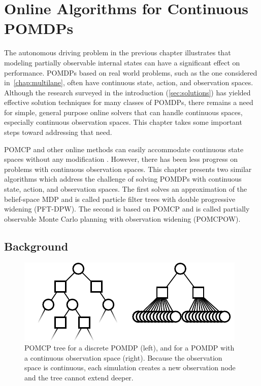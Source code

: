 \chapter{Online Algorithms for Continuous POMDPs} \label{chap:pomcpow}

The autonomous driving problem in the previous chapter illustrates that modeling partially observable internal states can have a significant effect on performance.
POMDPs based on real world problems, such as the one considered in~\cref{chap:multilane}, often have continuous state, action, and observation spaces.
Although the research surveyed in the introduction (\cref{sec:solutions}) has yielded effective solution techniques for many classes of POMDPs, there remains a need for simple, general purpose online solvers that can handle continuous spaces, especially continuous observation spaces.
This chapter takes some important steps toward addressing that need.

POMCP and other online methods can easily accommodate continuous state spaces without any modification \cite{goldhoorn2014continuous}.
However, there has been less progress on problems with continuous observation spaces.
This chapter presents two similar algorithms which address the challenge of solving POMDPs with continuous state, action, and observation spaces.
The first solves an approximation of the belief-space MDP and is called particle filter trees with double progressive widening (PFT-DPW).
The second is based on POMCP and is called partially observable Monte Carlo planning with observation widening (POMCPOW). 

\section{Background}

\begin{figure}[htb]
\begin{center}
    \includegraphics[width=0.9\columnwidth]{media/continuous_tree.pdf}
\end{center}
\caption[POMCP tree on a continuous observation space]{POMCP tree for a discrete POMDP (left), and for a POMDP with a continuous observation space (right). Because the observation space is continuous, each simulation creates a new observation node and the tree cannot extend deeper.}
\label{fig:ctree}
\end{figure}

